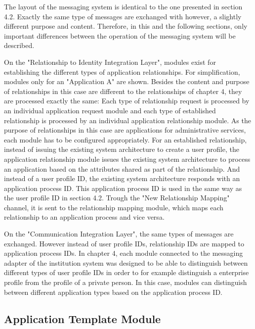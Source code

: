 The layout of the messaging system is identical to the one presented in section 4.2. Exactly the same type of messages are exchanged with however, a slightly different purpose and content. Therefore, in this and the following sections, only important differences between the operation of the messaging system will be described.

On the "Relationship to Identity Integration Layer", modules exist for establishing the different types of application relationships. For simplification, modules only for an "Application A" are shown. Besides the content and purpose of relationships in this case are different to the relationships of chapter 4, they are processed exactly the same: Each type of relationship request is processed by an individual application request module and each type of established relationship is processed by an individual application relationship module. As the purpose of relationships in this case are applications for administrative services, each module has to be configured appropriately. For an established relationship, instead of issuing the existing system architecture to create a user profile, the application relationship module issues the existing system architecture to process an application based on the attributes shared as part of the relationship. And instead of a user profile ID, the existing system architecture responds with an application process ID. This application process ID is used in the same way as the user profile ID in section 4.2. Trough the "New Relationship Mapping" channel, it is sent to the relationship mapping module, which maps each relationship to an application process and vice versa.

On the "Communication Integration Layer", the same types of messages are exchanged. However instead of user profile IDs, relationship IDs are mapped to application process IDs. In chapter 4, each module connected to the messaging adapter of the institution system was designed to be able to distinguish between different types of user profile IDs in order to for example distinguish a enterprise profile from the profile of a private person. In this case, modules can distinguish between different application types based on the application process ID.

\subsection{Application Template Module}

